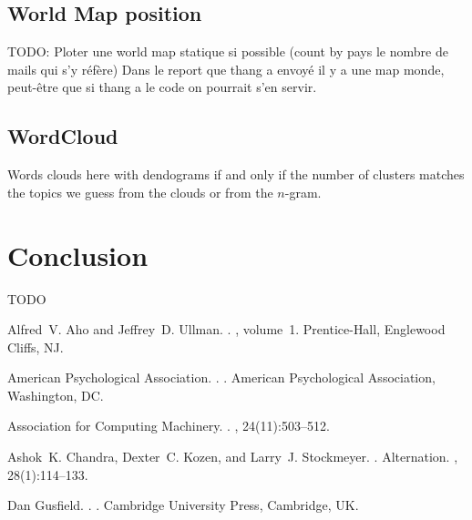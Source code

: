 \documentclass[11pt]{article}
\begin{document}
\subsection{World Map position}

TODO: Ploter une world map statique si possible (count by pays le nombre de mails qui s'y réfère) Dans le report que thang a envoyé il y a une map monde, peut-être que si thang a le code on pourrait s'en servir.

\subsection{WordCloud}

Words clouds here with dendograms if and only if the number of clusters matches the topics we guess from the clouds or from the $n$-gram.

\section{Conclusion}

TODO

\begin{thebibliography}{}

Alfred~V. Aho and Jeffrey~D. Ullman.
.
, volume~1.
\newblock Prentice-{Hall}, Englewood Cliffs, NJ.

{American Psychological Association}.
.
.
\newblock American Psychological Association, Washington, DC.

{Association for Computing Machinery}.
.
, 24(11):503--512.

Ashok~K. Chandra, Dexter~C. Kozen, and Larry~J. Stockmeyer.
.
\newblock Alternation.
,
  28(1):114--133.

Dan Gusfield.
.
.
\newblock Cambridge University Press, Cambridge, UK.

\end{thebibliography}
\end{document}
